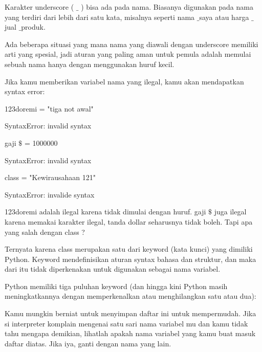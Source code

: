 \vspace{12pt}
\noindent 
Karakter underscore (  $  \_  $ ) bisa ada pada nama. Biasanya digunakan pada nama yang terdiri dari lebih dari satu kata, misalnya seperti $  $nama $  \_  $saya $  $atau $  $harga $  \_  $jual $  \_  $produk. \par
\vspace{12pt}
\noindent 
Ada beberapa situasi yang mana nama yang diawali dengan underscore memiliki arti yang spesial, jadi aturan yang paling aman untuk pemula adalah memulai sebuah nama hanya dengan menggunakan huruf kecil. \par
\vspace{12pt}
\noindent 
Jika kamu memberikan variabel nama yang ilegal, kamu akan mendapatkan syntax error: \par
\vspace{12pt}
\noindent 
123doremi = "tiga not awal" \par
\noindent 
SyntaxError: invalid syntax \par
\noindent 
gaji $  \$  $ = 1000000 \par
\noindent 
SyntaxError: invalid syntax \par
\noindent 
class = "Kewirausahaan 121" \par
\noindent 
SyntaxError: invalide syntax \par
\vspace{12pt}
\noindent 
123doremi $  $adalah ilegal karena tidak dimulai dengan huruf. $  $gaji $  \$  $ $  $juga ilegal karena memakai karakter ilegal, tanda dollar seharusnya tidak boleh. Tapi apa yang salah dengan $  $class $  $? \par
\vspace{12pt}
\noindent 
Ternyata karena $  $class $  $merupakan satu dari $  $keyword $  $(kata kunci) $  $yang dimiliki $  $Python. Keyword mendefinisikan aturan syntax bahasa dan struktur, dan maka dari itu tidak diperkenakan untuk digunakan sebagai nama variabel. \par
\vspace{12pt}
\noindent 
Python memiliki tiga puluhan keyword (dan hingga kini Python masih meningkatkannya dengan memperkenalkan atau menghilangkan satu atau dua): \par
\vspace{12pt}
\noindent 
Kamu mungkin berniat untuk menyimpan daftar ini untuk mempermudah. Jika si interpreter komplain mengenai satu sari nama variabel mu dan kamu tidak tahu mengapa demikian, lihatlah apakah nama variabel yang kamu buat masuk daftar diatas. Jika iya, ganti dengan nama yang lain. \par
